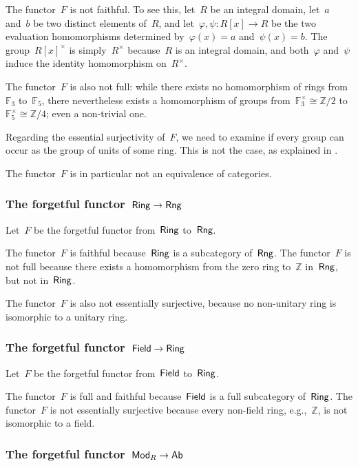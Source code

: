 The functor~$F$ is not faithful.
To see this, let~$R$ be an integral domain, let~$a$ and~$b$ be two distinct elements of~$R$, and let~$φ, ψ \colon R[x] \to R$ be the two evaluation homomorphisms determined by~$φ(x) = a$ and~$ψ(x) = b$.
The group~$R[x]^×$ is simply~$R^×$ because~$R$ is an integral domain, and both~$φ$ and~$ψ$ induce the identity homomorphism on~$R^×$.

The functor~$F$ is also not full:
while there exists no homomorphism of rings from~$𝔽_3$ to~$𝔽_5$, there nevertheless exists a homomorphism of groups from~$𝔽_3^× ≅ ℤ/2$ to~$𝔽_5^× ≅ ℤ/4$;
even a non-trivial one.

Regarding the essential surjectivity of~$F$, we need to examine if every group can occur as the group of units of some ring.
This is not the case, as explained in \autocite{stackexchange_groups_of_units_of_rings}.

The functor~$F$ is in particular not an equivalence of categories.



\subsubsection*{The forgetful functor~$\mathsf{Ring} \to \mathsf{Rng}$}

Let~$F$ be the forgetful functor from~$\mathsf{Ring}$ to~$\mathsf{Rng}$.

The functor~$F$ is faithful because~$\mathsf{Ring}$ is a subcategory of~$\mathsf{Rng}$.
The functor~$F$ is not full because there exists a homomorphism from the zero ring to~$ℤ$ in~$\mathsf{Rng}$, but not in~$\mathsf{Ring}$.

The functor~$F$ is also not essentially surjective, because no non-unitary ring is isomorphic to a unitary ring.



\subsubsection*{The forgetful functor~$\mathsf{Field} \to \mathsf{Ring}$}

Let~$F$ be the forgetful functor from~$\mathsf{Field}$ to~$\mathsf{Ring}$.

The functor~$F$ is full and faithful because~$\mathsf{Field}$ is a full subcategory of~$\mathsf{Ring}$.
The functor~$F$ is not essentially surjective because every non-field ring, e.g.,~$ℤ$, is not isomorphic to a field.



\subsubsection*{The forgetful functor~$\mathsf{Mod}_R \to \mathsf{Ab}$}

